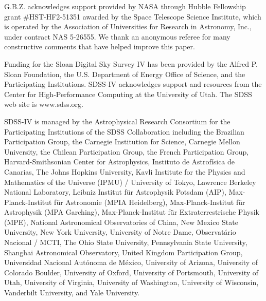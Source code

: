 \documentclass[12pt, appendixfloats, numberedappendix]{emulateapj}
\begin{document}
\acknowledgments

G.B.Z. acknowledges support provided by NASA through Hubble Fellowship grant \#HST-HF2-51351 awarded by the Space Telescope Science Institute, which is operated by the Association of Universities for Research in Astronomy, Inc., under contract NAS 5-26555. 
We thank an anonymous referee for many constructive comments that have helped improve this paper.

Funding for the Sloan Digital Sky Survey IV has been provided by
the Alfred P. Sloan Foundation, the U.S. Department of Energy Office of
Science, and the Participating Institutions. SDSS-IV acknowledges
support and resources from the Center for High-Performance Computing at
the University of Utah. The SDSS web site is www.sdss.org. 

SDSS-IV is managed by the Astrophysical Research Consortium for the 
Participating Institutions of the SDSS Collaboration including the 
Brazilian Participation Group, the Carnegie Institution for Science, 
Carnegie Mellon University, the Chilean Participation Group, the French Participation Group, Harvard-Smithsonian Center for Astrophysics, 
Instituto de Astrof\'isica de Canarias, The Johns Hopkins University, 
Kavli Institute for the Physics and Mathematics of the Universe (IPMU) / 
University of Tokyo, Lawrence Berkeley National Laboratory, 
Leibniz Institut f\"ur Astrophysik Potsdam (AIP),  
Max-Planck-Institut f\"ur Astronomie (MPIA Heidelberg), 
Max-Planck-Institut f\"ur Astrophysik (MPA Garching), 
Max-Planck-Institut f\"ur Extraterrestrische Physik (MPE), 
National Astronomical Observatories of China, New Mexico State University, 
New York University, University of Notre Dame, 
Observat\'ario Nacional / MCTI, The Ohio State University, 
Pennsylvania State University, Shanghai Astronomical Observatory, 
United Kingdom Participation Group,
Universidad Nacional Aut\'onoma de M\'exico, University of Arizona, 
University of Colorado Boulder, University of Oxford, University of Portsmouth, 
University of Utah, University of Virginia, University of Washington, University of Wisconsin, 
Vanderbilt University, and Yale University.




\end{document}
